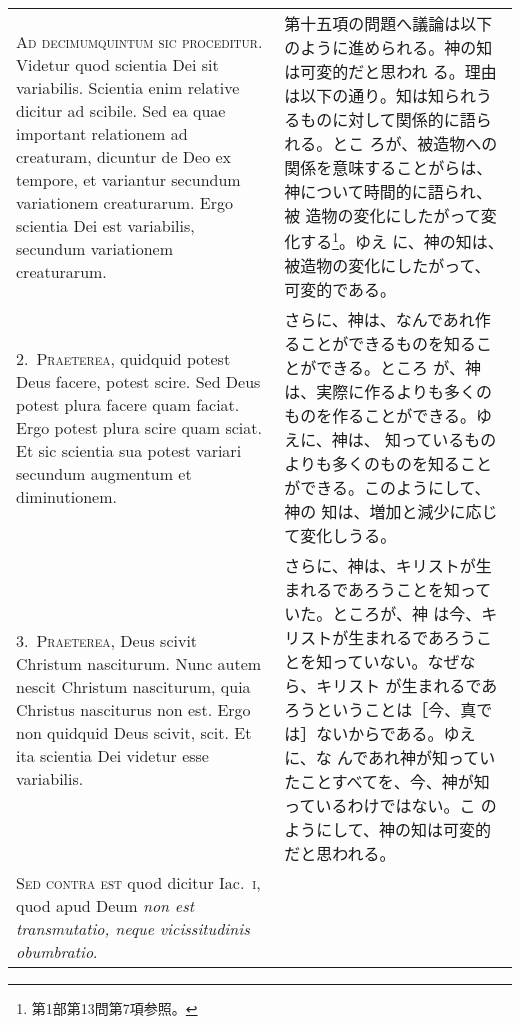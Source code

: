 \documentclass[10pt]{jsarticle} %
\begin{document}
\begin{longtable}{p{21em}p{21em}}


{\huge A}{\scshape d decimumquintum sic proceditur}. Videtur
quod scientia Dei sit variabilis. Scientia enim relative dicitur ad
scibile. Sed ea quae important relationem ad creaturam, dicuntur de Deo
ex tempore, et variantur secundum variationem creaturarum. Ergo scientia
Dei est variabilis, secundum variationem creaturarum.


&

第十五項の問題へ議論は以下のように進められる。神の知は可変的だと思われ
る。理由は以下の通り。知は知られうるものに対して関係的に語られる。とこ
ろが、被造物への関係を意味することがらは、神について時間的に語られ、被
造物の変化にしたがって変化する\footnote{第1部第13問第7項参照。}。ゆえ
に、神の知は、被造物の変化にしたがって、可変的である。


\\


{\scshape 2.~Praeterea}, quidquid potest Deus facere,
potest scire. Sed Deus potest plura facere quam faciat. Ergo potest
plura scire quam sciat. Et sic scientia sua potest variari secundum
augmentum et diminutionem.

&

さらに、神は、なんであれ作ることができるものを知ることができる。ところ
が、神は、実際に作るよりも多くのものを作ることができる。ゆえに、神は、
知っているものよりも多くのものを知ることができる。このようにして、神の
知は、増加と減少に応じて変化しうる。


\\


{\scshape 3.~Praeterea}, Deus scivit Christum
nasciturum. Nunc autem nescit Christum nasciturum, quia Christus
nasciturus non est. Ergo non quidquid Deus scivit, scit. Et ita scientia
Dei videtur esse variabilis.

&

さらに、神は、キリストが生まれるであろうことを知っていた。ところが、神
は今、キリストが生まれるであろうことを知っていない。なぜなら、キリスト
が生まれるであろうということは［今、真では］ないからである。ゆえに、な
んであれ神が知っていたことすべてを、今、神が知っているわけではない。こ
のようにして、神の知は可変的だと思われる。

\\


{\scshape Sed contra est} quod dicitur Iac.~{\scshape i}, quod
apud Deum {\itshape non est transmutatio, neque vicissitudinis obumbratio}.


\end{longtable}
\end{document}
